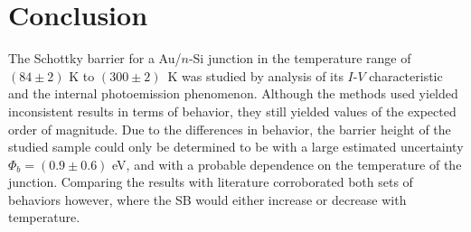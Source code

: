 \section{Conclusion}

The Schottky barrier for a Au/$n$-Si junction in the temperature range of $(84 \pm 2)$ K to \mbox{$(300 \pm 2)$ K} was studied by analysis of its $I$-$V$ characteristic and the internal photoemission phenomenon.
Although the methods used yielded inconsistent results in terms of behavior, they still yielded values of the expected order of magnitude.
Due to the differences in behavior, the barrier height of the studied sample could only be determined to be with a large estimated uncertainty $\Phi_b = (0.9 \pm 0.6)$ eV, and with a probable dependence on the temperature of the junction.
Comparing the results with literature corroborated both sets of behaviors however, where the SB would either increase or decrease with temperature.
